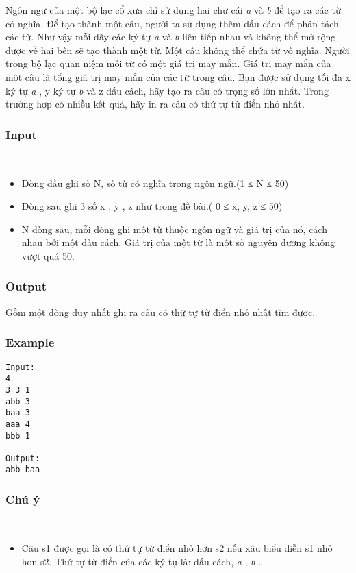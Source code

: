 

Ngôn ngữ của một bộ lạc cổ xưa chỉ sử dụng hai chữ cái \emph{ a } và \emph{ b } để tạo ra các từ có nghĩa. Để tạo thành một câu, người ta sử dụng thêm dấu cách để phân tách các từ. Như vậy mỗi dãy các ký tự \emph{ a } và \emph{ b } liên tiếp nhau và không thể mở rộng được về hai bên sẽ tạo thành một từ. Một câu không thể chứa từ vô nghĩa. Người trong bộ lạc quan niệm mỗi từ có một giá trị may mắn. Giá trị may mắn của một câu là tổng giá trị may mắn của các từ trong câu. Bạn được sử dụng tối đa x ký tự \emph{ a } , y ký tự \emph{ b } và z dấu cách, hãy tạo ra câu có trọng số lớn nhất. Trong trường hợp có nhiều kết quả, hãy in ra câu có thứ tự từ điển nhỏ nhất.

\subsubsection{Input}

 
\begin{itemize}
	\item Dòng đầu ghi số N, số từ có nghĩa trong ngôn ngữ.(1 ≤ N ≤ 50)
	\item Dòng sau ghi 3 số x , y , z như trong đề bài.( 0 ≤ x, y, z ≤ 50)
	\item N dòng sau, mỗi dòng ghi một từ thuộc ngôn ngữ và giá trị của nó, cách nhau bởi một dấu cách. Giá trị của một từ là một số nguyên dương không vượt quá 50.
\end{itemize}

\subsubsection{Output}

Gồm một dòng duy nhất ghi ra câu có thứ tự từ điển nhỏ nhất tìm được.

\subsubsection{Example}
\begin{verbatim}
Input:
4
3 3 1
abb 3
baa 3
aaa 4
bbb 1

Output:
abb baa
\end{verbatim}

\subsubsection{Chú ý}

 
\begin{itemize}
	\item Câu s1 được gọi là có thứ tự từ điển nhỏ hơn s2 nếu xâu biểu diễn s1 nhỏ hơn s2. Thứ tự từ điển của các ký tự là: dấu cách, \emph{ a } , \emph{ b } .
\end{itemize}